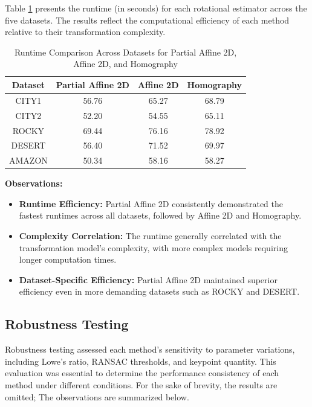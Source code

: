 Table \ref{tab:runtime_comparison_rotestim} presents the runtime (in seconds) for each rotational estimator across the five datasets. The results reflect the computational efficiency of each method relative to their transformation complexity.

\begin{table}[H]
    \centering
    \caption{Runtime Comparison Across Datasets for Partial Affine 2D, Affine 2D, and Homography}
    \label{tab:runtime_comparison_rotestim}
    \begin{tabular}{|c|c|c|c|}
    \hline
    \textbf{Dataset} & \textbf{Partial Affine 2D} & \textbf{Affine 2D} & \textbf{Homography} \\ \hline
    CITY1   & 56.76 & 65.27 & 68.79 \\ \hline
    CITY2   & 52.20 & 54.55 & 65.11 \\ \hline
    ROCKY   & 69.44 & 76.16 & 78.92 \\ \hline
    DESERT  & 56.40 & 71.52 & 69.97 \\ \hline
    AMAZON  & 50.34 & 58.16 & 58.27 \\ \hline
    \end{tabular}
\end{table}

\textbf{Observations:}  
\begin{itemize}
    \item \textbf{Runtime Efficiency:} Partial Affine 2D consistently demonstrated the fastest runtimes across all datasets, followed by Affine 2D and Homography.
    \item \textbf{Complexity Correlation:} The runtime generally correlated with the transformation model's complexity, with more complex models requiring longer computation times.
    \item \textbf{Dataset-Specific Efficiency:} Partial Affine 2D maintained superior efficiency even in more demanding datasets such as ROCKY and DESERT.
\end{itemize}

\subsection{Robustness Testing}

Robustness testing assessed each method's sensitivity to parameter variations, including Lowe’s ratio, RANSAC thresholds, and keypoint quantity. This evaluation was essential to determine the performance consistency of each method under different conditions. For the sake of brevity, the results are omitted; The observations are summarized below.



